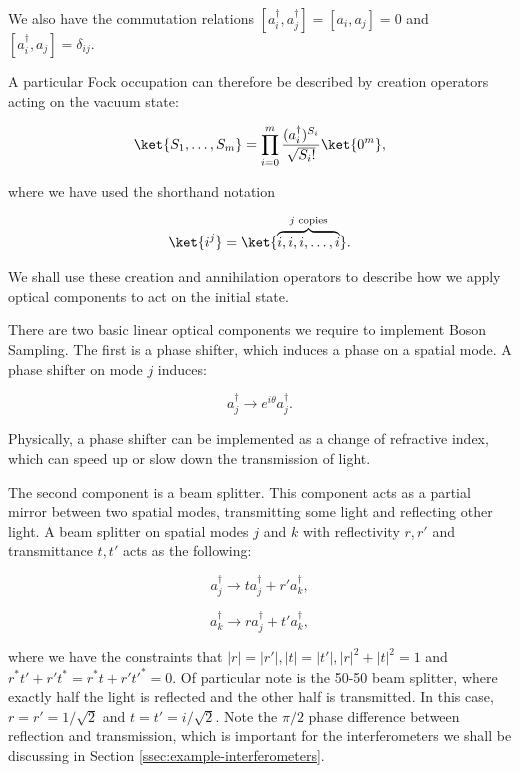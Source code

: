 We also have the commutation relations $[a_i^\dagger, a_j^\dagger] = [a_i,a_j] = 0$ and $[a_i^\dagger, a_j] = \delta_{ij}$.

A particular Fock occupation can therefore be described by creation operators acting on the vacuum state:

\begin{equation}
\ket{S_1,\dots,S_m} = \prod_{i=0}^m\frac{(a_i^\dagger)^{S_i}}{\sqrt{S_i!}}\ket{0^m},
\end{equation}

\noindent where we have used the shorthand notation

\begin{equation}
\ket{i^j} = \ket{\overbrace{i,i,i,\dots,i}^{j \textrm{ copies}}}.
\end{equation}

We shall use these creation and annihilation operators to describe how we apply optical components to act on the initial state.

There are two basic linear optical components we require to implement Boson Sampling. The first is a phase shifter, which induces a phase on a spatial mode. A phase shifter on mode $j$ induces:

\begin{equation}
a_j^\dagger \rightarrow e^{i\theta}a_j^\dagger.
\end{equation}

Physically, a phase shifter can be implemented as a change of refractive index, which can speed up or slow down the transmission of light.

The second component is a beam splitter. This component acts as a partial mirror between two spatial modes, transmitting some light and reflecting other light. A beam splitter on spatial modes $j$ and $k$ with reflectivity $r, r'$ and transmittance $t, t'$ acts as the following:

\begin{equation}
a_j^\dagger \rightarrow ta_j^\dagger + r'a_k^\dagger,
\end{equation}

\begin{equation}
a_k^\dagger \rightarrow ra_j^\dagger + t'a_k^\dagger,
\end{equation}

\noindent where we have the constraints that $|r|=|r'|, |t|=|t'|, |r|^2+|t|^2=1$ and $r^*t' + r't^* = r^*t+r't'^*=0$. Of particular note is the 50-50 beam splitter, where exactly half the light is reflected and the other half is transmitted. In this case, $r=r'=1/\sqrt{2}$ and $t=t'=i/\sqrt{2}$. Note the $\pi/2$ phase difference between reflection and transmission, which is important for the interferometers we shall be discussing in Section \ref{ssec:example-interferometers}.

